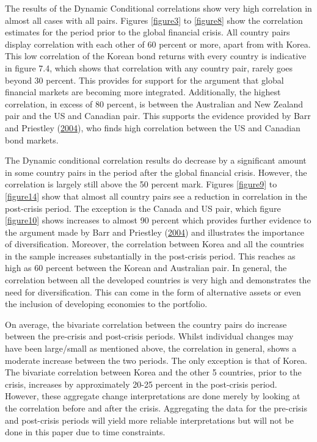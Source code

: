 \documentclass[11pt,preprint, authoryear]{elsarticle}
\numberwithin{equation}{section}
\numberwithin{figure}{section}
\numberwithin{table}{section}
\begin{document}
The results of the Dynamic Conditional correlations show very high
correlation in almost all cases with all pairs. Figures \ref{figure3} to
\ref{figure8} show the correlation estimates for the period prior to the
global financial crisis. All country pairs display correlation with each
other of 60 percent or more, apart from with Korea. This low correlation
of the Korean bond returns with every country is indicative in figure
7.4, which shows that correlation with any country pair, rarely goes
beyond 30 percent. This provides for support for the argument that
global financial markets are becoming more integrated. Additionally, the
highest correlation, in excess of 80 percent, is between the Australian
and New Zealand pair and the US and Canadian pair. This supports the
evidence provided by Barr and Priestley
(\protect\hyperlink{ref-barr2004}{2004}), who finds high correlation
between the US and Canadian bond markets.

The Dynamic conditional correlation results do decrease by a significant
amount in some country pairs in the period after the global financial
crisis. However, the correlation is largely still above the 50 percent
mark. Figures \ref{figure9} to \ref{figure14} show that almost all
country pairs see a reduction in correlation in the post-crisis period.
The exception is the Canada and US pair, which figure \ref{figure10}
shows increases to almost 90 percent which provides further evidence to
the argument made by Barr and Priestley
(\protect\hyperlink{ref-barr2004}{2004}) and illustrates the importance
of diversification. Moreover, the correlation between Korea and all the
countries in the sample increases substantially in the post-crisis
period. This reaches as high as 60 percent between the Korean and
Australian pair. In general, the correlation between all the developed
countries is very high and demonstrates the need for diversification.
This can come in the form of alternative assets or even the inclusion of
developing economies to the portfolio.

On average, the bivariate correlation between the country pairs do
increase between the pre-crisis and post-crisis periods. Whilst
individual changes may have been large/small as mentioned above, the
correlation in general, shows a moderate increase between the two
periods. The only exception is that of Korea. The bivariate correlation
between Korea and the other 5 countries, prior to the crisis, increases
by approximately 20-25 percent in the post-crisis period. However, these
aggregate change interpretations are done merely by looking at the
correlation before and after the crisis. Aggregating the data for the
pre-crisis and post-crisis periods will yield more reliable
interpretations but will not be done in this paper due to time
constraints.
\end{document}
